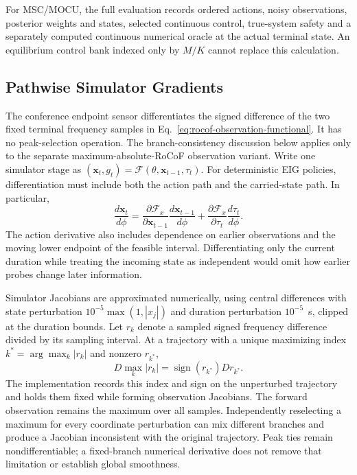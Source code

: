 \documentclass[journal]{IEEEtran}
\begin{document}
For MSC/MOCU, the full evaluation records ordered actions, noisy observations, posterior
weights and states, selected continuous control, true-system safety and a
separately computed continuous numerical oracle at the actual terminal state.
An equilibrium control bank indexed only by $M/K$ cannot replace this calculation.

\subsection{Pathwise Simulator Gradients}
The conference endpoint sensor differentiates the signed difference of the
two fixed terminal frequency samples in
Eq.~\eqref{eq:rocof-observation-functional}. It has no peak-selection operation.
The branch-consistency discussion below applies only to the separate
maximum-absolute-RoCoF observation variant.
Write one simulator stage as
$(\mathbf x_t,g_t)=\mathcal F(\theta,\mathbf x_{t-1},\tau_t)$.
For deterministic EIG policies, differentiation must include both the action
path and the carried-state path. In particular,
\begin{equation}
\frac{d\mathbf x_t}{d\phi}=
\frac{\partial\mathcal F_x}{\partial\mathbf x_{t-1}}
\frac{d\mathbf x_{t-1}}{d\phi}
+\frac{\partial\mathcal F_x}{\partial\tau_t}
\frac{d\tau_t}{d\phi}.
\label{eq:state-chain-gradient}
\end{equation}
The action derivative also includes dependence on earlier observations and
the moving lower endpoint of the feasible interval. Differentiating only the
current duration while treating the incoming state as independent would omit
how earlier probes change later information.

Simulator Jacobians are approximated numerically, using central differences
with state perturbation $10^{-5}\max(1,|x_j|)$ and duration perturbation
$10^{-5}$~s, clipped at the duration bounds. Let $r_k$ denote a sampled signed
frequency difference divided by its sampling interval. At a trajectory with a
unique maximizing index $k^*=\arg\max_k|r_k|$ and nonzero $r_{k^*}$,
\begin{equation}
D\max_k|r_k|=\operatorname{sign}(r_{k^*})D r_{k^*}.
\label{eq:active-rocof-gradient}
\end{equation}
The implementation records this index and sign on the unperturbed trajectory
and holds them fixed while forming observation Jacobians. The forward
observation remains the maximum over all samples. Independently reselecting
a maximum for every coordinate perturbation can mix different branches and
produce a Jacobian inconsistent with the original trajectory. Peak ties remain
nondifferentiable; a fixed-branch numerical derivative does not remove that
limitation or establish global smoothness.
\end{document}
